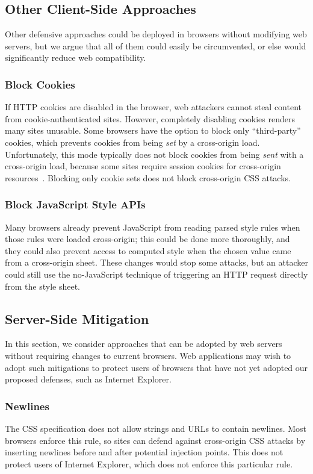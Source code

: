 \documentclass{sig-alternate}
\begin{document}
\subsection{Other Client-Side Approaches}
Other defensive approaches could be deployed in browsers without
modifying web servers, but we argue that all of them could easily be
circumvented, or else would significantly reduce web compatibility.

\subsubsection{Block Cookies}
If HTTP cookies are disabled in the browser, web attackers cannot
steal content from cookie-au\-then\-ti\-cated sites.  However, completely
disabling cookies renders many sites unusable.  Some browsers have the
option to block only “third-party” cookies, which prevents cookies
from being \emph{set} by a cross-origin load.  Unfortunately, this
mode typically does not block cookies from being \emph{sent} with a
cross-origin load, because some sites require session cookies for
cross-origin resources~\cite{jackson06thirdpartycookies}.  Blocking
only cookie sets does not block cross-origin CSS attacks.

\subsubsection{Block JavaScript Style APIs}
Many browsers already prevent JavaScript from reading parsed style
rules when those rules were loaded cross-origin; this could be done
more thoroughly, and they could also prevent access to computed style
when the chosen value came from a cross-origin sheet.  These changes
would stop some attacks, but an attacker could still use the
no-JavaScript technique of triggering an HTTP request directly from
the style sheet.

\subsection{Server-Side Mitigation}
In this section, we consider approaches that can be adopted
by web servers without requiring changes to current browsers.
Web applications may wish to adopt such mitigations to
protect users of browsers that have not yet adopted our
proposed defenses, such as Internet Explorer.

\subsubsection{Newlines}
The CSS specification does not allow strings and URLs to contain
newlines.  Most browsers enforce this rule, so sites can defend
against cross-origin CSS attacks by inserting newlines before and
after potential injection points.  This does not protect users of
Internet Explorer, which does not enforce this particular rule.
\end{document}
